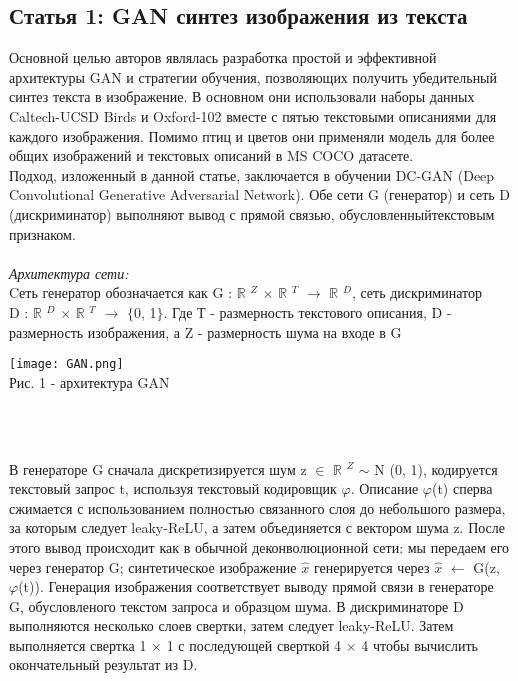 \documentclass{article}
\begin{document}
    \newpage
    \begin{center} 
    \section{Статья 1: GAN синтез изображения из текста}
    \end{center} 
    \large 
    Основной целью авторов являлась разработка простой и эффективной архитектуры GAN и стратегии обучения, позволяющих получить убедительный синтез текста в изображение. В основном они использовали наборы данных Caltech-UCSD Birds и Oxford-102 вместе с пятью текстовыми описаниями для каждого изображения. Помимо птиц и цветов они применяли модель для более общих изображений и текстовых описаний в MS COCO датасете.
    \\
    Подход, изложенный в данной статье, заключается в обучении DC-GAN (Deep Convolutional Generative Adversarial Network). Обе сети G (генератор) и сеть D (дискриминатор) выполняют вывод с прямой связью, обусловленныйтекстовым признаком.
    \\ \\
    \textit{Архитектура сети:}
    \\
    Cеть генератор обозначается как G : $\mathbb{R}$ $^Z$ $\times$ $\mathbb{R}$ $^T$ $\rightarrow$ $\mathbb{R}$ $^D$, сеть дискриминатор 
    \\
    D : $\mathbb{R}$ $^D$ $\times$ $\mathbb{R}$ $^T$ $\rightarrow$ $\{$0, 1$\}$.
    Где Т - размерность текстового описания, D - размерность изображения, а Z - размерность шума на входе в G
    \\
    \begin{center} 
    \texttt{[image: GAN.png]}
    \\
    \caption{Рис. 1 - архитектура GAN}
    \\ \\
    \end{center} 
    В генераторе G сначала дискретизируется шум z $\in$ $\mathbb{R}$ $^Z$ $\sim$ N (0, 1), кодируется текстовый запрос t, используя текстовый кодировщик $\varphi$. Описание $\varphi$(t) сперва сжимается с использованием полностью связанного слоя до небольшого размера, за которым следует leaky-ReLU, а затем объединяется с вектором шума z. После этого вывод происходит как в обычной деконволюционной сети: мы передаем его через генератор G; синтетическое изображение $\hat{x}$ генерируется через $\hat{x}$ $\leftarrow$ G(z, $\varphi$(t)). Генерация изображения соответствует выводу прямой связи в генераторе G,  обусловленого текстом запроса и образцом шума. В дискриминаторе D выполняются несколько слоев свертки, затем следует leaky-ReLU. Затем выполняется свертка 1 × 1 с последующей сверткой 4 × 4 чтобы вычислить окончательный результат из D. 
\end{document}
